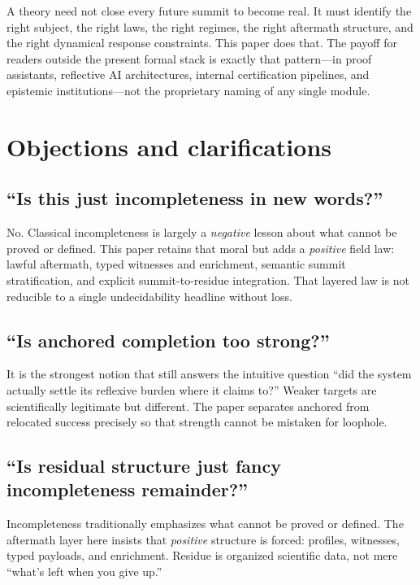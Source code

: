 \documentclass[11pt]{article}
\theoremstyle{plain}
\theoremstyle{definition}
\theoremstyle{remark}
\begin{document}
A theory need not close every future summit to become real. It must identify the right subject, the right laws, the right regimes, the right aftermath structure, and the right dynamical response constraints. This paper does that. The payoff for readers outside the present formal stack is exactly that pattern---in proof assistants, reflective AI architectures, internal certification pipelines, and epistemic institutions---not the proprietary naming of any single module.

\section{Objections and clarifications}

\subsection{``Is this just incompleteness in new words?''}

No. Classical incompleteness is largely a \emph{negative} lesson about what cannot be proved or defined. This paper retains that moral but adds a \emph{positive} field law: lawful aftermath, typed witnesses and enrichment, semantic summit stratification, and explicit summit-to-residue integration. That layered law is not reducible to a single undecidability headline without loss.

\subsection{``Is anchored completion too strong?''}

It is the strongest notion that still answers the intuitive question ``did the system actually settle its reflexive burden where it claims to?'' Weaker targets are scientifically legitimate but different. The paper separates anchored from relocated success precisely so that strength cannot be mistaken for loophole.

\subsection{``Is residual structure just fancy incompleteness remainder?''}

Incompleteness traditionally emphasizes what cannot be proved or defined. The aftermath layer here insists that \emph{positive} structure is forced: profiles, witnesses, typed payloads, and enrichment. Residue is organized scientific data, not mere ``what's left when you give up.''
\end{document}

